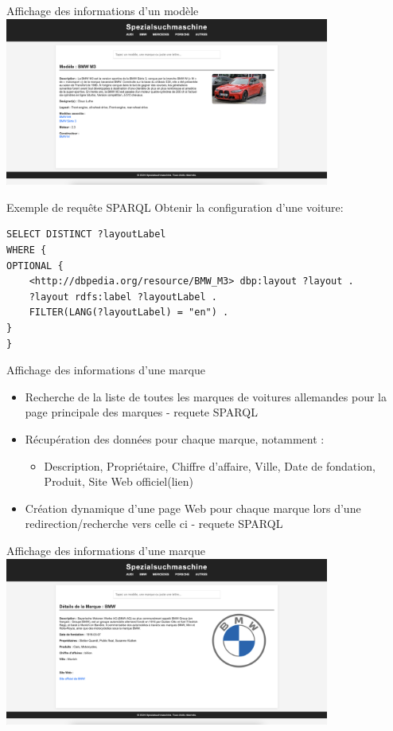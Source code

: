 \documentclass[10pt]{beamer}
\begin{document}
\begin{frame}{Affichage des informations d'un modèle}
\centering
\includegraphics[width=0.8\textwidth]{images/modele.png}
\end{frame}

\begin{frame}[fragile]{Exemple de requête SPARQL}
Obtenir la configuration d'une voiture:
{\footnotesize
\begin{verbatim}
SELECT DISTINCT ?layoutLabel
WHERE {
OPTIONAL {
    <http://dbpedia.org/resource/BMW_M3> dbp:layout ?layout .
    ?layout rdfs:label ?layoutLabel .
    FILTER(LANG(?layoutLabel) = "en") .
}
}
\end{verbatim}
}
\end{frame}

\begin{frame}{Affichage des informations d'une marque}
\begin{itemize}
    \item Recherche de la liste de toutes les  marques de voitures allemandes pour la page principale des marques - requete SPARQL
    \item Récupération des données pour chaque marque, notamment :
    \begin{itemize}
        \item Description, Propriétaire, Chiffre d’affaire, Ville, Date de fondation, Produit, Site Web officiel(lien)
    \end{itemize}
    \item Création dynamique d’une page Web pour chaque marque lors d’une redirection/recherche  vers celle ci - requete SPARQL
\end{itemize}
\end{frame}


\begin{frame}{Affichage des informations d'une marque}
\centering
\includegraphics[width=0.8\textwidth]{images/marque.png}
\end{frame}
\end{document}
